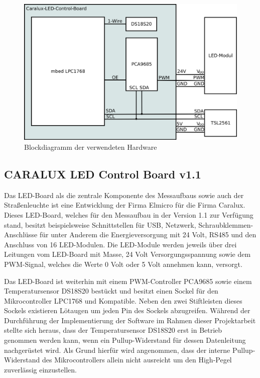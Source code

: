 \documentclass[a4paper,12pt]{scrartcl}
\begin{document}
\begin{figure}[htb]
\begin{center}
\includegraphics[width=0.8\hsize]{./schematics/blockDiagramm.png}
\end{center}
\caption{\label{fig:blockDia}Blockdiagramm der verwendeten Hardware}
\end{figure}

\subsection{CARALUX LED Control Board v1.1}
Das LED-Board als die zentrale Komponente des Messaufbaus sowie auch der Straßenleuchte ist eine Entwicklung der Firma Elmicro für die Firma Caralux. Dieses LED-Board, welches für den Messaufbau in der Version 1.1 zur Verfügung stand, besitzt beispielsweise Schnittstellen für USB, Netzwerk, Schraubklemmen-Anschlüsse für unter Anderem die Energieversorgung mit 24 Volt, RS485 und den Anschluss von 16 LED-Modulen. Die LED-Module werden jeweils über drei Leitungen vom LED-Board mit Masse, 24 Volt Versorgungsspannung sowie dem PWM-Signal, welches die Werte 0 Volt oder 5 Volt annehmen kann, versorgt.

Das LED-Board ist weiterhin mit einem PWM-Controller PCA9685 sowie einem Temperatursensor DS18S20 bestückt und besitzt einen Sockel für den Mikrocontroller LPC1768 und Kompatible. Neben den zwei Stiftleisten dieses Sockels existieren Lötaugen um jeden Pin des Sockels abzugreifen. Während der Durchführung der Implementierung der Software im Rahmen dieser Projektarbeit stellte sich heraus, dass der Temperatursensor DS18S20 erst in Betrieb genommen werden kann, wenn ein Pullup-Widerstand für dessen Datenleitung nachgerüstet wird. Als Grund hierfür wird angenommen, dass der interne Pullup-Widerstand des Mikrocontrollers allein nicht ausreicht um den High-Pegel zuverlässig einzustellen.
\end{document}
